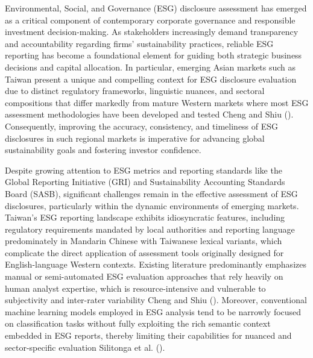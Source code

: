 \documentclass[
  12pt,
]{article}
\begin{document}
Environmental, Social, and Governance (ESG) disclosure assessment has
emerged as a critical component of contemporary corporate governance and
responsible investment decision-making. As stakeholders increasingly
demand transparency and accountability regarding firms' sustainability
practices, reliable ESG reporting has become a foundational element for
guiding both strategic business decisions and capital allocation. In
particular, emerging Asian markets such as Taiwan present a unique and
compelling context for ESG disclosure evaluation due to distinct
regulatory frameworks, linguistic nuances, and sectoral compositions
that differ markedly from mature Western markets where most ESG
assessment methodologies have been developed and tested Cheng and Shiu
(). Consequently, improving the accuracy,
consistency, and timeliness of ESG disclosures in such regional markets
is imperative for advancing global sustainability goals and fostering
investor confidence.

Despite growing attention to ESG metrics and reporting standards like
the Global Reporting Initiative (GRI) and Sustainability Accounting
Standards Board (SASB), significant challenges remain in the effective
assessment of ESG disclosures, particularly within the dynamic
environments of emerging markets. Taiwan's ESG reporting landscape
exhibits idiosyncratic features, including regulatory requirements
mandated by local authorities and reporting language predominately in
Mandarin Chinese with Taiwanese lexical variants, which complicate the
direct application of assessment tools originally designed for
English-language Western contexts. Existing literature predominantly
emphasizes manual or semi-automated ESG evaluation approaches that rely
heavily on human analyst expertise, which is resource-intensive and
vulnerable to subjectivity and inter-rater variability Cheng and Shiu
(). Moreover, conventional machine
learning models employed in ESG analysis tend to be narrowly focused on
classification tasks without fully exploiting the rich semantic context
embedded in ESG reports, thereby limiting their capabilities for nuanced
and sector-specific evaluation Silitonga et al.
().
\end{document}
